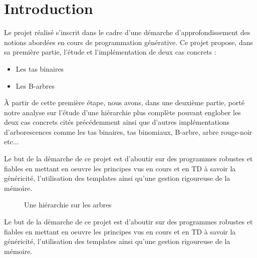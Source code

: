 \chapter{Introduction}
Le projet réalisé s'inscrit dans le cadre d’une démarche d’approfondissement des notions abordées en cours de programmation générative. Ce projet propose, dans sa première partie, l'étude et l’implémentation de deux cas concrets :
\begin{itemize}
   \item Les tas binaires
   \item Les B-arbres
\end{itemize}

À partir de cette première étape, nous avons, dans une deuxième partie, porté notre analyse sur l'étude d'une hiérarchie plus complète pouvant englober les deux cas concrets cités précédemment ainsi que d'autres implémentations d'arborescences comme les tas binaires, tas binomiaux, B-arbre, arbre rouge-noir etc...

Le but de la démarche de ce projet est d'aboutir sur des programmes robustes et fiables en mettant en oeuvre les principes vus en cours et en TD à savoir la généricité, l'utilisation des templates ainsi qu'une gestion rigoureuse de la mémoire.
\begin{figure}[h]
	\centering
	\caption{Une hiérarchie sur les arbres}
	\label{fig:hierarchie}
\end{figure}
Le but de la démarche de ce projet est d'aboutir sur des programmes robustes et fiables en mettant en oeuvre les principes vus en cours et en TD à savoir la généricité, l'utilisation des templates ainsi qu'une gestion rigoureuse de la mémoire.
